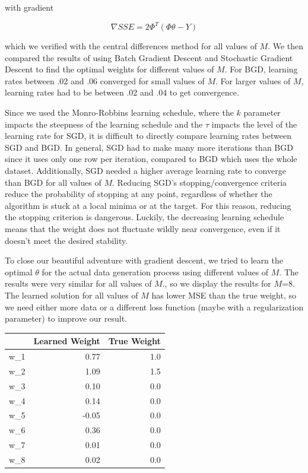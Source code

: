 \documentclass[10pt]{article}
\begin{document}
with gradient 

\begin{equation*}
	\nabla SSE = 2\Phi^T(\Phi \theta-Y)
\end{equation*}

 which we verified with the central differences method for all values of $M$. We then compared the results of using Batch Gradient Descent and Stochastic Gradient Descent to find the optimal weights for different values of $M$. For BGD, learning rates between .02 and .06 converged for small values of $M$. For larger values of $M$,  learning rates had to be between .02 and .04 to get convergence.
 
Since we used the Monro-Robbins learning schedule, where  the $k$ parameter impacts the steepness of the learning schedule and the $\tau$ impacts the level of the learning rate for SGD, it is difficult to directly compare learning rates between SGD and BGD. In general, SGD had to make many more iterations than BGD since it uses only one row per iteration, compared to BGD which uses the whole dataset. Additionally, SGD needed a higher average learning rate to converge than BGD for all values of $M$.
 Reducing SGD's stopping/convergence criteria reduce the probability of stopping at any point, regardless of whether the algorithm is stuck at a local minima or at the target. For this reason, reducing the stopping criterion is dangerous. Luckily, the decreasing learning schedule means that the weight does not fluctuate wildly near convergence, even if it doesn't meet the desired stability. 

To close our beautiful adventure with gradient descent, we tried to learn the optimal $\theta$ for the actual data generation process using different values of $M$. The results were very similar for all values of $M$., so we display the results for $M$=8.  The learned solution for all values of $M$ has lower MSE than the true weight, so we need either more data or a different loss function (maybe with a regularization parameter) to improve our result. 
\begin{centering}
\begin{table}

\begin{tabular}{lrr}
\toprule
{} &  Learned Weight &  True Weight \\
\midrule
w\_1 &            0.77 &          1.0 \\
w\_2 &            1.09 &          1.5 \\
w\_3 &            0.10 &          0.0 \\
w\_4 &            0.14 &          0.0 \\
w\_5 &           -0.05 &          0.0 \\
w\_6 &            0.36 &          0.0 \\
w\_7 &            0.01 &          0.0 \\
w\_8 &            0.02 &          0.0 \\
\bottomrule
\end{tabular}

\end{table}
\end{centering}
\end{document}
